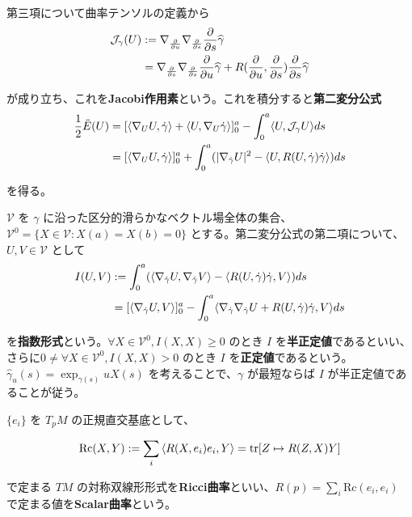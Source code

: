 \documentclass[dvipdfmx,a4paper]{jsreport}
\theoremstyle{definition}
\newcommand{\der}{\partial}
\renewcommand{\hat}{\widehat}
\begin{document}
第三項について曲率テンソルの定義から 
\begin{align*}
    \mathcal{J}_{\gamma}(U) &:=\nabla_{\der \over \der u} \nabla_{\der \over \der s}{\der \over \der s}\hat{\gamma} \\
    &=\nabla_{\der \over \der s} \nabla_{\der \over \der s}{\der \over \der u}\hat{\gamma}+R({\der \over \der u},{\der \over \der s}){\der \over \der s}\hat{\gamma}    
\end{align*}

が成り立ち、これを\textbf{Jacobi作用素}という。これを積分すると\textbf{第二変分公式}
\begin{align*}
    {1 \over 2}\ddot{E}(U) &= [\langle \nabla_{U}U,\dot{\gamma} \rangle
    +\langle U,\nabla_{U}\dot{\gamma} \rangle]_0^a
    -\int_0^a \langle U,\mathcal{J}_{\gamma} U \rangle ds \\
    &= [\langle \nabla_{U}U,\dot{\gamma} \rangle
    ]_0^a
    +\int_0^a (| \nabla_{\dot{\gamma}}U|^2-\langle U,R(U,\dot{\gamma})\dot{\gamma} \rangle) ds
\end{align*}

を得る。

$\mathcal{V}$ を $\gamma$ に沿った区分的滑らかなベクトル場全体の集合、$\mathcal{V}^0=\{X\in \mathcal{V} \colon X(a)=X(b)=0\}$ とする。第二変分公式の第二項について、$U,V\in \mathcal{V}$ として
\begin{align*}
    I(U,V) &:=\int_0^a (\langle \nabla_{\dot{\gamma}} U, \nabla_{\dot{\gamma}} V \rangle-\langle R(U,\dot{\gamma})\dot{\gamma} ,V\rangle) ds \\
    &=[\ev{\nabla_{\dot{\gamma}}U,V}]_0^a -\int_0^a \langle \nabla_{\dot{\gamma}}\nabla_{\dot{\gamma}}U+R(U,\dot{\gamma})\dot{\gamma} ,V \rangle ds \\
\end{align*}

を\textbf{指数形式}という。$\forall X \in \mathcal{V}^0,I(X,X) \geq 0$ のとき $I$ を\textbf{半正定値}であるといい、さらに$0\neq \forall X \in \mathcal{V}^0,I(X,X) >0$ のとき $I$ を\textbf{正定値}であるという。$\hat{\gamma}_u(s)=\exp_{\gamma(s)}uX(s)$ を考えることで、$\gamma$ が最短ならば $I$ が半正定値であることが従う。

$\{e_i\}$ を $T_pM$ の正規直交基底として、

\begin{align*}
    \mbox{Rc}(X,Y):=\sum_i \ev{R(X,e_i)e_i,Y}=\tr[Z \mapsto R(Z,X)Y]
\end{align*}

で定まる $TM$ の対称双線形形式を\textbf{Ricci曲率}といい、$R(p)=\sum_i \mbox{Rc}(e_i,e_i)$ で定まる値を\textbf{Scalar曲率}という。
\end{document}
